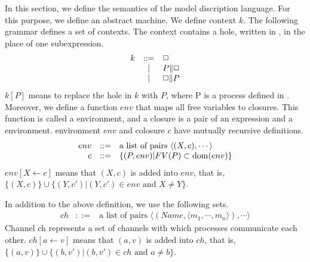 In this section, we define the semantics of the model discription language.
For this purpose, we define an abstract machine.
We define context \(k\).
The following grammar defines a set of contexts.
The context contains a hole, written in \hole, in the place of one subexpression.
  \begin{displaymath}
    \begin{array}{lcl}
k     &::=& \mbox{$\Box$} \\
      & | & P\|\mbox{$\Box$}\\
      & | & \mbox{$\Box$}\|P
    \end{array}
  \end{displaymath}
$k[P]$ means to replace the hole in $k$ with $P$, where P is a process defined in .
Moreover, we define a function $env$ that maps all free variables to closures.
This function is called a environment, and a closure is a pair of an expression and a environment.
environment \(env\) and colosure \(c\) have mutually recursive definitions.
  \begin{displaymath}
    \begin{array}{rcl}
env &::=& \mbox{a list of pairs }\langle(X,c),\cdots\rangle\\
c &::=& \{(P,env)|FV(P)\subset \mathop{\mathrm{dom}}\nolimits(env)\}\\
    \end{array}
  \end{displaymath}
\(env[X\leftarrow c]\) means that \((X,c)\) is added into \(env\), that is, 
\(\{(X,c)\}\cup\{(Y,c')|(Y,c')\in env \mbox{ and } X\neq Y\}\).

In addition to the above definition, we use the following sets.
  \begin{displaymath}
    \begin{array}{rcl}
ch &::=&\mbox{a list of pairs }\langle(Name,\langle m_1,\cdots,m_n\rangle),\cdots\rangle
    \end{array}
  \end{displaymath}
Channel ch represents a set of channels with which processes communicate each other.
\(ch[a\leftarrow v]\) means that \((a,v)\) is added into \(ch\), that is, 
\(\{(a,v)\}\cup\{(b,v')|(b,v')\in ch \mbox{ and } a\neq b\}\).

